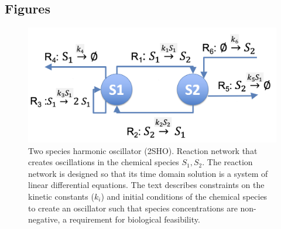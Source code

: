 \documentclass{bmcart}
\begin{document}
\begin{backmatter}



\newpage
\section*{Figures}
\newpage

\begin{figure}
        \centering
         \includegraphics[scale=0.5]{figures/Figure_1.png}
         \caption[]{Two species harmonic oscillator (2SHO). Reaction network that creates oscillations in the chemical species $S_1, S_2$. The reaction network is designed so that its time domain solution is a system of linear differential equations. The text describes constraints on the kinetic constants ($k_i$) and initial conditions of the chemical species to create an oscillator such that species concentrations are non-negative, a requirement for biological feasibility.} 
         \label{fig:reaction-network}
\end{figure}


\end{backmatter}
\end{document}
